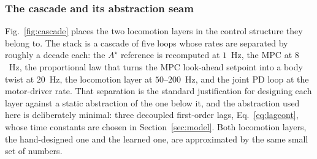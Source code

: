 \documentclass[11pt,a4paper]{article}
\newcommand{\astar}{$A^\star$}
\begin{document}

\subsubsection{The cascade and its abstraction seam}
\label{sec:cascade}

Fig.~\ref{fig:cascade} places the two locomotion layers in the control structure they belong to. The stack is
a cascade of five loops whose rates are separated by roughly a decade each: the \astar{} reference is
recomputed at $1$~Hz, the MPC at $8$~Hz, the proportional law that turns the MPC look-ahead setpoint into a
body twist at $20$~Hz, the locomotion layer at $50$--$200$~Hz, and the joint PD loop at the
motor-driver rate. That separation is the standard justification for designing each layer against a static
abstraction of the one below it, and the abstraction used here is deliberately minimal: three decoupled
first-order lags, Eq.~\eqref{eq:lagcont}, whose time constants are chosen in Section~\ref{sec:model}. Both
locomotion layers, the hand-designed one and the learned one, are approximated by the same small set of numbers.

\end{document}
